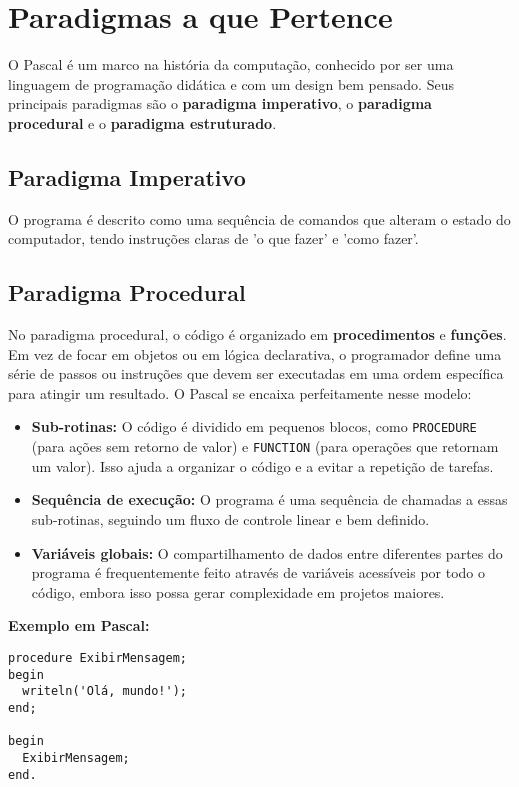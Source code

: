 \documentclass[12pt,a4paper,oneside]{abntex2}
\begin{document}
\chapter{Paradigmas a que Pertence}
O Pascal é um marco na história da computação, conhecido por ser uma linguagem de programação didática e com um design bem pensado. Seus principais paradigmas são o \textbf{paradigma imperativo}, o \textbf{paradigma procedural} e o \textbf{paradigma estruturado}.

\section{Paradigma Imperativo}
O programa é descrito como uma sequência de comandos que alteram o estado do computador, tendo instruções claras de 'o que fazer' e 'como fazer'.

\section{Paradigma Procedural}
No paradigma procedural, o código é organizado em \textbf{procedimentos} e \textbf{funções}. Em vez de focar em objetos ou em lógica declarativa, o programador define uma série de passos ou instruções que devem ser executadas em uma ordem específica para atingir um resultado. O Pascal se encaixa perfeitamente nesse modelo:

\begin{itemize}
    \item \textbf{Sub-rotinas:} O código é dividido em pequenos blocos, como \texttt{PROCEDURE} (para ações sem retorno de valor) e \texttt{FUNCTION} (para operações que retornam um valor). Isso ajuda a organizar o código e a evitar a repetição de tarefas.
    \item \textbf{Sequência de execução:} O programa é uma sequência de chamadas a essas sub-rotinas, seguindo um fluxo de controle linear e bem definido.
    \item \textbf{Variáveis globais:} O compartilhamento de dados entre diferentes partes do programa é frequentemente feito através de variáveis acessíveis por todo o código, embora isso possa gerar complexidade em projetos maiores.
\end{itemize}
\textbf{Exemplo em Pascal:}
\begin{verbatim}
procedure ExibirMensagem;
begin
  writeln('Olá, mundo!');
end;

begin
  ExibirMensagem;
end.
\end{verbatim}
\end{document}
